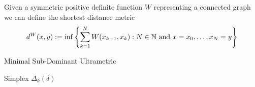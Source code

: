 \begin{definition}{}{}
Given a symmetric positive definite function $W$ representing a connected graph we can define the shortest distance metric
\begin{equation*}
    d^W(x,y) := \inf\left\{ \sum_{k = 1}^N W(x_{k-1}, x_k): N \in \mathbb N \text{ and } x = x_0, \dots, x_N = y\right\}
\end{equation*}
\end{definition}



\begin{defprop}{}{}

Minimal Sub-Dominant Ultrametric
\end{defprop}


\begin{definition}{Simplex $\Delta_k(\delta)$}{}
\end{definition}